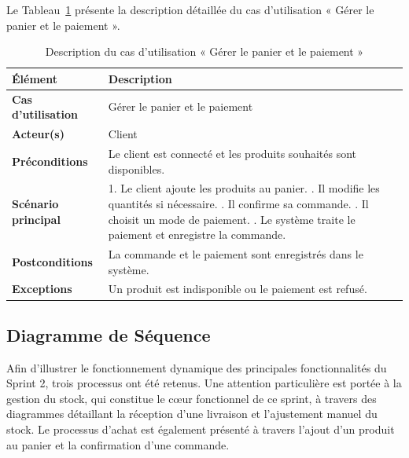 Le Tableau~\ref{tab:uc6_sprint2} présente la description détaillée du cas d’utilisation « Gérer le panier et le paiement ».
\begin{longtable}{|>{\raggedright\arraybackslash}p{4cm}|>{\raggedright\arraybackslash}p{10.5cm}|}

\caption{Description du cas d’utilisation « Gérer le panier et le paiement »}
\label{tab:uc6_sprint2}\\

\hline
\textbf{Élément} & \textbf{Description} \\
\hline

\textbf{Cas d’utilisation} & Gérer le panier et le paiement \\
\hline

\textbf{Acteur(s)} & Client \\
\hline

\textbf{Préconditions} &
Le client est connecté et les produits souhaités sont disponibles. \\
\hline

\textbf{Scénario principal} &

1. Le client ajoute les produits au panier. \newline
2. Il modifie les quantités si nécessaire. \newline
3. Il confirme sa commande. \newline
4. Il choisit un mode de paiement. \newline
5. Le système traite le paiement et enregistre la commande. \\
   \hline

\textbf{Postconditions} &
La commande et le paiement sont enregistrés dans le système. \\
\hline

\textbf{Exceptions} &
Un produit est indisponible ou le paiement est refusé. \\
\hline

\end{longtable}



\subsection{Diagramme de Séquence}

Afin d'illustrer le fonctionnement dynamique des principales fonctionnalités du Sprint 2, trois processus ont été retenus. Une attention particulière est portée à la gestion du stock, qui constitue le cœur fonctionnel de ce sprint, à travers des diagrammes détaillant la réception d'une livraison et l'ajustement manuel du stock. Le processus d'achat est également présenté à travers l'ajout d'un produit au panier et la confirmation d'une commande.

